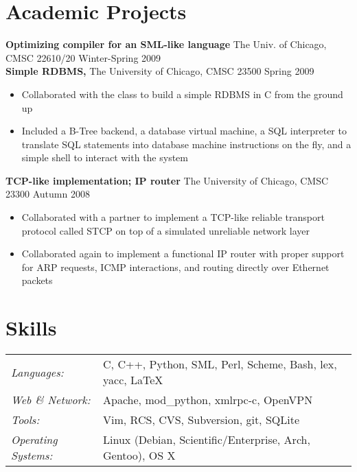 \documentclass[line,overlapped]{res}
\begin{document}
\begin{resume}
\section{Academic Projects}
{\bf Optimizing compiler for an SML-like language} The Univ. of Chicago, CMSC 22610/20 \hfill Winter-Spring 2009\\
{\bf Simple RDBMS,} The University of Chicago, CMSC 23500 \hfill Spring 2009
\begin{itemize} \itemsep -2pt
    \item Collaborated with the class to build a simple RDBMS in C from the ground up
    \item Included a B-Tree backend, a database virtual machine, a SQL interpreter to translate SQL statements into database machine instructions on the fly, and a simple shell to interact with the system
\end{itemize}
\vspace{-10pt}
{\bf TCP-like implementation; IP router} The University of Chicago, CMSC 23300 \hfill Autumn 2008
\begin{itemize} \itemsep -2pt
    \item Collaborated with a partner to implement a TCP-like reliable transport protocol called STCP on top of a simulated unreliable network layer
    \item Collaborated again to implement a functional IP router with proper support for ARP requests, ICMP interactions, and routing directly over Ethernet packets
\end{itemize}



\section{Skills}
   \begin{tabular}{l p{4in}}
   {\sl Languages:}&C, C++, Python, SML, Perl, Scheme, Bash, lex, yacc, \LaTeX\\
   {\sl Web \& Network:} & Apache, mod\_python, xmlrpc-c, OpenVPN\\
   {\sl Tools: } & Vim, RCS, CVS, Subversion, git, SQLite\\
   {\sl Operating Systems:} & Linux (Debian, Scientific/Enterprise, Arch, Gentoo), OS X\\
 \end{tabular}

\end{resume} 
\end{document}
